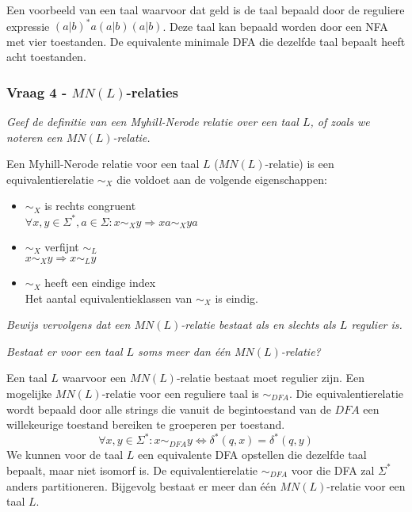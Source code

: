 Een voorbeeld van een taal waarvoor dat geld is de taal bepaald door de reguliere expressie $(a|b)^*a(a|b)(a|b)$. Deze taal kan bepaald worden door een NFA met vier toestanden. De equivalente minimale DFA die dezelfde taal bepaalt heeft acht toestanden.

\subsubsection{Vraag 4 - $MN(L)$-relaties}

\textit{Geef de definitie van een Myhill-Nerode relatie over een taal $L$, of zoals we noteren een $MN(L)$-relatie.}

Een Myhill-Nerode relatie voor een taal $L$ ($MN(L)$-relatie) is een equivalentierelatie $\sim_X$ die voldoet aan de volgende eigenschappen:
  \begin{itemize}
  \item $\sim_X$ is rechts congruent\\$\forall x, y \in \Sigma^*, a \in \Sigma: x \sim_X y \Rightarrow xa \sim_X ya$
  \item $\sim_X$ verfijnt $\sim_L$\\$x \sim_X y \Rightarrow x \sim_L y$
  \item $\sim_X$ heeft een eindige index\\Het aantal equivalentieklassen van $\sim_X$ is eindig.
  \end{itemize}

\textit{Bewijs vervolgens dat een $MN(L)$-relatie bestaat als en slechts als $L$ regulier is.}



\textit{Bestaat er voor een taal $L$ soms meer dan één $MN(L)$-relatie?}

Een taal $L$ waarvoor een $MN(L)$-relatie bestaat moet regulier zijn. Een mogelijke $MN(L)$-relatie voor een reguliere taal is $\sim_{DFA}$. Die equivalentierelatie wordt bepaald door alle strings die vanuit de begintoestand van de $DFA$ een willekeurige toestand bereiken te groeperen per toestand.
\begin{equation*}
\forall x, y \in \Sigma^*: x \sim_{DFA} y \Leftrightarrow \delta^*(q, x) = \delta^*(q, y)
\end{equation*}
We kunnen voor de taal $L$ een equivalente DFA opstellen die dezelfde taal bepaalt, maar niet isomorf is. De equivalentierelatie $\sim_{DFA}$ voor die DFA zal $\Sigma^*$ anders partitioneren. Bijgevolg bestaat er meer dan \'e\'en $MN(L)$-relatie voor een taal $L$.

